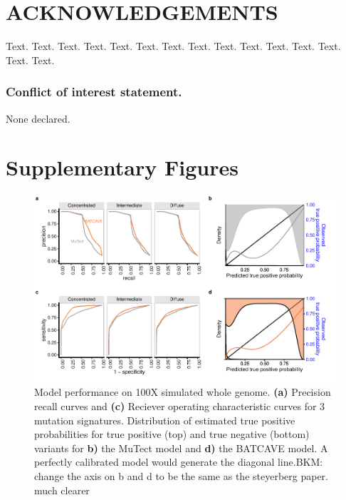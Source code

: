 \documentclass[a4,center,fleqn]{NAR}
\newcommand{\bkmcomment}[1]{{\color{blue}BKM: #1}}
\newcommand{\batcave}{BATCAVE }
\begin{document}
\section{ACKNOWLEDGEMENTS}

Text. Text. Text. Text. Text. Text. Text. Text. Text. Text. Text.
Text. Text. Text. Text.


\subsubsection{Conflict of interest statement.} None declared.






\section{Supplementary Figures}


\begin{figure}
  \begin{center}
  \includegraphics{figures/fig_wes.pdf}
  \end{center}
  \caption{Model performance on 100X simulated whole genome.
  \textbf{(a)} Precision recall curves and \textbf{(c)} Reciever operating characteristic curves for 3 mutation signatures.
  Distribution of estimated true positive probabilities for true positive (top) and true negative (bottom) variants for \textbf{b)} the MuTect model and \textbf{d)} the \batcave model.
  A perfectly calibrated model would generate the diagonal line.\bkmcomment{change the axis on b and d to be the same as the steyerberg paper. much clearer}}
\label{NAR-wgs_fig}
\end{figure}
\end{document}
